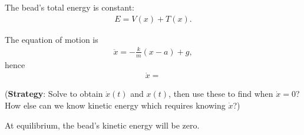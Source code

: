The bead's total energy is constant:
\begin{align*}
  E = V(x) + T(x).
\end{align*}

The equation of motion is
\begin{align*}
  \ddot{x} = -\frac{k}{m}(x - a) + g,
\end{align*}
hence
\begin{align*}
  \dot{x} =
\end{align*}

({\bf Strategy}: Solve to obtain $\dot{x}(t)$ and $x(t)$, then use these to find when $\dot{x}=0$?
How else can we know kinetic energy which requires knowing $\dot{x}$?)

At equilibrium, the bead's kinetic energy will be zero.